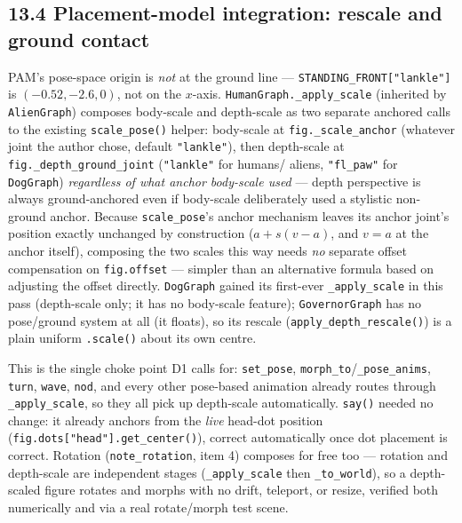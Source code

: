 \documentclass[
  11pt,
]{book}
\begin{document}
\subsection{\texorpdfstring{13.4 Placement-model integration: rescale and ground contact}{13.4 Placement-model integration}}\label{placement-model-integration-depth}

PAM's pose-space origin is \emph{not} at the ground line ---
\texttt{STANDING\_FRONT["lankle"]} is $(-0.52, -2.6, 0)$, not on the
$x$-axis. \texttt{HumanGraph.\_apply\_scale} (inherited by
\texttt{AlienGraph}) composes body-scale and depth-scale as two
separate anchored calls to the existing \texttt{scale\_pose()} helper:
body-scale at \texttt{fig.\_scale\_anchor} (whatever joint the author
chose, default \texttt{"lankle"}), then depth-scale at
\texttt{fig.\_depth\_ground\_joint} (\texttt{"lankle"} for humans/
aliens, \texttt{"fl\_paw"} for \texttt{DogGraph}) \emph{regardless of
what anchor body-scale used} --- depth perspective is always
ground-anchored even if body-scale deliberately used a stylistic
non-ground anchor. Because \texttt{scale\_pose}'s anchor mechanism
leaves its anchor joint's position exactly unchanged by construction
($a + s(v-a)$, and $v = a$ at the anchor itself), composing the two
scales this way needs \emph{no} separate offset compensation on
\texttt{fig.offset} --- simpler than an alternative formula based on
adjusting the offset directly. \texttt{DogGraph} gained its first-ever
\texttt{\_apply\_scale} in this pass (depth-scale only; it has no
body-scale feature); \texttt{GovernorGraph} has no pose/ground system
at all (it floats), so its rescale (\texttt{apply\_depth\_rescale()})
is a plain uniform \texttt{.scale()} about its own centre.

This is the single choke point D1 calls for: \texttt{set\_pose},
\texttt{morph\_to}/\texttt{\_pose\_anims}, \texttt{turn},
\texttt{wave}, \texttt{nod}, and every other pose-based animation
already routes through \texttt{\_apply\_scale}, so they all pick up
depth-scale automatically. \texttt{say()} needed no change: it already
anchors from the \emph{live} head-dot position
(\texttt{fig.dots["head"].get\_center()}), correct automatically once
dot placement is correct. Rotation (\texttt{note\_rotation}, item 4)
composes for free too --- rotation and depth-scale are independent
stages (\texttt{\_apply\_scale} then \texttt{\_to\_world}), so a
depth-scaled figure rotates and morphs with no drift, teleport, or
resize, verified both numerically and via a real rotate/morph test
scene.
\end{document}
